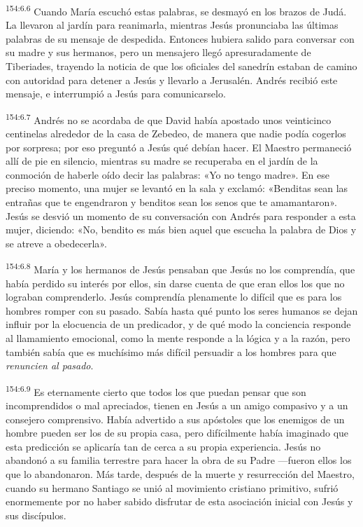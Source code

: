 \par 
\textsuperscript{154:6.6} Cuando María escuchó estas palabras, se desmayó en los brazos de Judá. La llevaron al jardín para reanimarla, mientras Jesús pronunciaba las últimas palabras de su mensaje de despedida. Entonces hubiera salido para conversar con su madre y sus hermanos, pero un mensajero llegó apresuradamente de Tiberiades, trayendo la noticia de que los oficiales del sanedrín estaban de camino con autoridad para detener a Jesús y llevarlo a Jerusalén. Andrés recibió este mensaje, e interrumpió a Jesús para comunicarselo.

\par 
\textsuperscript{154:6.7} Andrés no se acordaba de que David había apostado unos veinticinco centinelas alrededor de la casa de Zebedeo, de manera que nadie podía cogerlos por sorpresa; por eso preguntó a Jesús qué debían hacer. El Maestro permaneció allí de pie en silencio, mientras su madre se recuperaba en el jardín de la conmoción de haberle oído decir las palabras: «Yo no tengo madre». En ese preciso momento, una mujer se levantó en la sala y exclamó: «Benditas sean las entrañas que te engendraron y benditos sean los senos que te amamantaron». Jesús se desvió un momento de su conversación con Andrés para responder a esta mujer, diciendo: «No, bendito es más bien aquel que escucha la palabra de Dios y se atreve a obedecerla».

\par 
\textsuperscript{154:6.8} María y los hermanos de Jesús pensaban que Jesús no los comprendía, que había perdido su interés por ellos, sin darse cuenta de que eran ellos los que no lograban comprenderlo. Jesús comprendía plenamente lo difícil que es para los hombres romper con su pasado. Sabía hasta qué punto los seres humanos se dejan influir por la elocuencia de un predicador, y de qué modo la conciencia responde al llamamiento emocional, como la mente responde a la lógica y a la razón, pero también sabía que es muchísimo más difícil persuadir a los hombres para que \textit{renuncien al pasado}.

\par 
\textsuperscript{154:6.9} Es eternamente cierto que todos los que puedan pensar que son incomprendidos o mal apreciados, tienen en Jesús a un amigo compasivo y a un consejero comprensivo. Había advertido a sus apóstoles que los enemigos de un hombre pueden ser los de su propia casa, pero difícilmente había imaginado que esta predicción se aplicaría tan de cerca a su propia experiencia. Jesús no abandonó a su familia terrestre para hacer la obra de su Padre ---fueron ellos los que lo abandonaron. Más tarde, después de la muerte y resurrección del Maestro, cuando su hermano Santiago se unió al movimiento cristiano primitivo, sufrió enormemente por no haber sabido disfrutar de esta asociación inicial con Jesús y sus discípulos.

